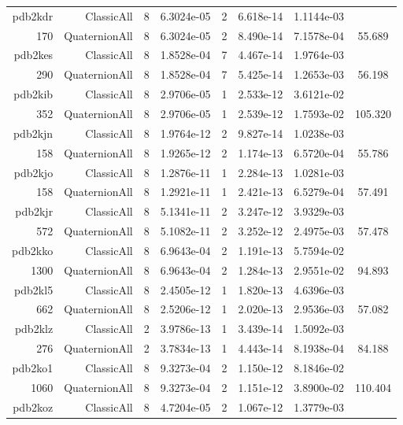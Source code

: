\begin{xltabular}{\textwidth}{r|rcS[table-format=1.4e+2]cS[table-format=1.3e+2]S[table-format=1.4e+2]S[table-format=-1.3]}
pdb2kdr & ClassicAll & 8 & 6.3024e-05 & 2 & 6.618e-14 & 1.1144e-03 & \\
170 & QuaternionAll & 8 & 6.3024e-05 & 2 & 8.490e-14 & 7.1578e-04 & 55.689\\  \addlinespace
pdb2kes & ClassicAll & 8 & 1.8528e-04 & 7 & 4.467e-14 & 1.9764e-03 & \\
290 & QuaternionAll & 8 & 1.8528e-04 & 7 & 5.425e-14 & 1.2653e-03 & 56.198\\  \addlinespace
pdb2kib & ClassicAll & 8 & 2.9706e-05 & 1 & 2.533e-12 & 3.6121e-02 & \\
352 & QuaternionAll & 8 & 2.9706e-05 & 1 & 2.539e-12 & 1.7593e-02 & 105.320\\  \addlinespace
pdb2kjn & ClassicAll & 8 & 1.9764e-12 & 2 & 9.827e-14 & 1.0238e-03 & \\
158 & QuaternionAll & 8 & 1.9265e-12 & 2 & 1.174e-13 & 6.5720e-04 & 55.786\\  \addlinespace
pdb2kjo & ClassicAll & 8 & 1.2876e-11 & 1 & 2.284e-13 & 1.0281e-03 & \\
158 & QuaternionAll & 8 & 1.2921e-11 & 1 & 2.421e-13 & 6.5279e-04 & 57.491\\  \addlinespace
pdb2kjr & ClassicAll & 8 & 5.1341e-11 & 2 & 3.247e-12 & 3.9329e-03 & \\
572 & QuaternionAll & 8 & 5.1082e-11 & 2 & 3.252e-12 & 2.4975e-03 & 57.478\\  \addlinespace
pdb2kko & ClassicAll & 8 & 6.9643e-04 & 2 & 1.191e-13 & 5.7594e-02 & \\
1300 & QuaternionAll & 8 & 6.9643e-04 & 2 & 1.284e-13 & 2.9551e-02 & 94.893\\  \addlinespace
pdb2kl5 & ClassicAll & 8 & 2.4505e-12 & 1 & 1.820e-13 & 4.6396e-03 & \\
662 & QuaternionAll & 8 & 2.5206e-12 & 1 & 2.020e-13 & 2.9536e-03 & 57.082\\  \addlinespace
pdb2klz & ClassicAll & 2 & 3.9786e-13 & 1 & 3.439e-14 & 1.5092e-03 & \\
276 & QuaternionAll & 2 & 3.7834e-13 & 1 & 4.443e-14 & 8.1938e-04 & 84.188\\  \addlinespace
pdb2ko1 & ClassicAll & 8 & 9.3273e-04 & 2 & 1.150e-12 & 8.1846e-02 & \\
1060 & QuaternionAll & 8 & 9.3273e-04 & 2 & 1.151e-12 & 3.8900e-02 & 110.404\\  \addlinespace
pdb2koz & ClassicAll & 8 & 4.7204e-05 & 2 & 1.067e-12 & 1.3779e-03 & \\

\end{xltabular}
